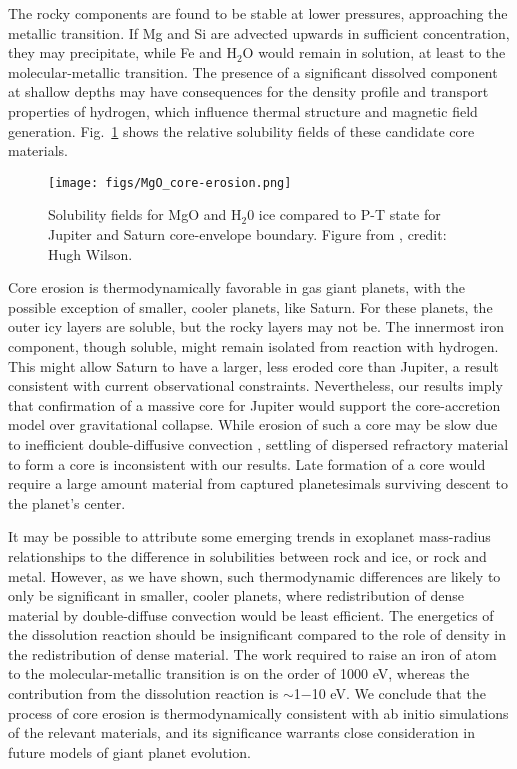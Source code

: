 The rocky components are found to be stable at lower pressures, approaching the
metallic transition. If Mg and Si are advected upwards in sufficient
concentration, they may precipitate, while Fe and $\mathrm{H}_2\mathrm{O}$
would remain in solution, at least to the molecular-metallic transition.  The
presence of a significant dissolved component at shallow depths may have
consequences for the density profile and transport properties of hydrogen,
which influence thermal structure and magnetic field generation.
Fig.~\ref{fig:mgoerosion} shows the relative solubility fields of these
candidate core materials.

 \begin{figure}[h] %
   \centering
   \texttt{[image: figs/MgO\_core-erosion.png]} 
\caption{ Solubility fields for MgO and H$_2$0 ice compared to P-T state for Jupiter and Saturn
    core-envelope boundary. Figure from \citet{wilson12b}, credit: Hugh Wilson.\label{fig:mgoerosion}}
\end{figure}

Core erosion is thermodynamically favorable in gas giant planets,
with the possible exception of smaller, cooler planets, like Saturn. For these planets, the
outer icy layers are soluble, but the rocky layers may not be. The innermost
iron component, though soluble, might remain isolated from reaction with hydrogen.
This might allow Saturn to have a larger, less eroded core than
Jupiter, a result consistent with current observational constraints.
Nevertheless, our results imply
that confirmation of a massive core for Jupiter would support the
core-accretion model over gravitational collapse. While erosion of such a core
may be slow due to inefficient double-diffusive convection
\citep{Stevenson1982a,Chabrier2007,Leconte2012,Mirouh2012}, settling of dispersed
refractory material to form a core is inconsistent with our results. Late formation of a core
would require a large amount material from captured planetesimals
surviving descent to the planet's center.

It may be possible to attribute some
emerging trends in exoplanet mass-radius relationships to the difference in
solubilities between rock and ice, or rock and metal. However, as we have
shown, such thermodynamic differences are likely to only be significant in
smaller, cooler planets, where redistribution of dense material by
double-diffuse convection would be least efficient. The energetics of the
dissolution reaction should be insignificant compared to the role of density
in the redistribution of dense material. The work required to raise an iron of atom to
the molecular-metallic transition is on the order of 1000 eV, whereas the
contribution from the dissolution reaction is $\sim$1$-$10 eV. We conclude
that the process of core erosion is thermodynamically consistent with ab
initio simulations of the relevant materials, and its
significance warrants close consideration in future models of giant planet
evolution.




